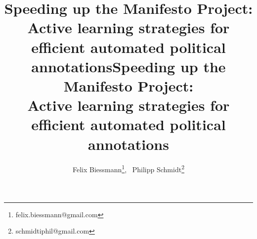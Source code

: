 \documentclass[runningheads,a4paper]{article}
\begin{document}

\title{Speeding up the Manifesto Project: Active learning strategies for efficient automated political annotations}

\title{Speeding up the Manifesto Project: \\ Active learning strategies for \\efficient automated political annotations}

%
%
\author{
Felix Biessmann\thanks{felix.biessmann@gmail.com},~ 
Philipp Schmidt\thanks{schmidtiphil@gmail.com}
}
%


%
%

\maketitle
\end{document}
